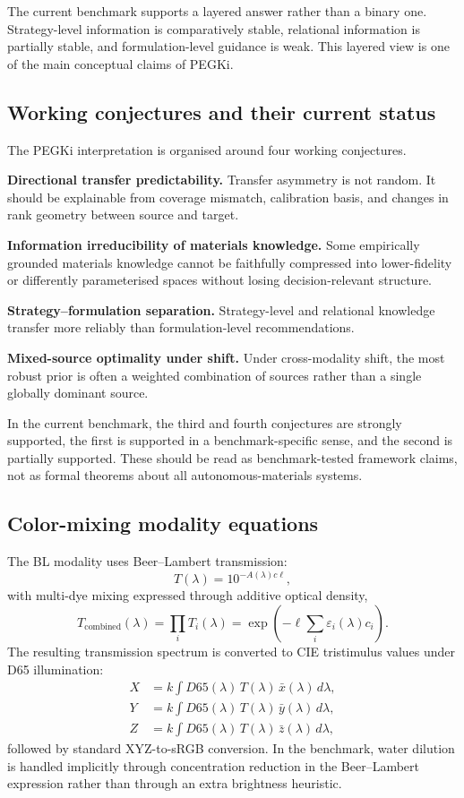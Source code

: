 \documentclass[twoside,twocolumn,9pt]{article}
\begin{document}
The current benchmark supports a layered answer rather than a binary one. Strategy-level information is comparatively stable, relational information is partially stable, and formulation-level guidance is weak. This layered view is one of the main conceptual claims of PEGKi.

\subsection{Working conjectures and their current status}

The PEGKi interpretation is organised around four working conjectures.

\textbf{Directional transfer predictability.} Transfer asymmetry is not random. It should be explainable from coverage mismatch, calibration basis, and changes in rank geometry between source and target.

\textbf{Information irreducibility of materials knowledge.} Some empirically grounded materials knowledge cannot be faithfully compressed into lower-fidelity or differently parameterised spaces without losing decision-relevant structure.

\textbf{Strategy--formulation separation.} Strategy-level and relational knowledge transfer more reliably than formulation-level recommendations.

\textbf{Mixed-source optimality under shift.} Under cross-modality shift, the most robust prior is often a weighted combination of sources rather than a single globally dominant source.

In the current benchmark, the third and fourth conjectures are strongly supported, the first is supported in a benchmark-specific sense, and the second is partially supported. These should be read as benchmark-tested framework claims, not as formal theorems about all autonomous-materials systems.

\subsection{Color-mixing modality equations}

The BL modality uses Beer--Lambert transmission:
\[
T(\lambda)=10^{-A(\lambda)c\ell},
\]
with multi-dye mixing expressed through additive optical density,
\[
T_{\mathrm{combined}}(\lambda)=\prod_i T_i(\lambda)
=\exp\!\left(-\ell \sum_i \varepsilon_i(\lambda)c_i\right).
\]
The resulting transmission spectrum is converted to CIE tristimulus values under D65 illumination:
\[
\begin{aligned}
X&=k\int D65(\lambda)\,T(\lambda)\,\bar{x}(\lambda)\,d\lambda,\\
Y&=k\int D65(\lambda)\,T(\lambda)\,\bar{y}(\lambda)\,d\lambda,\\
Z&=k\int D65(\lambda)\,T(\lambda)\,\bar{z}(\lambda)\,d\lambda,
\end{aligned}
\]
followed by standard XYZ-to-sRGB conversion. In the benchmark, water dilution is handled implicitly through concentration reduction in the Beer--Lambert expression rather than through an extra brightness heuristic.
\end{document}
